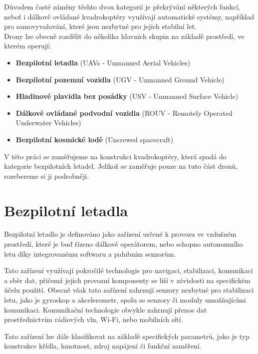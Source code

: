 \documentclass[12pt]{report}
\begin{document}
Důvodem časté záměny těchto dvou kategorií je překrývání některých funkcí, neboť i dálkově ovládané kvadrokoptéry využívají automatické systémy, například pro samovyvažování, které jsou nezbytné pro jejich stabilní let.\\

Drony lze obecně rozdělit do několika hlavních skupin na základě prostředí, ve kterém operují:
\begin{itemize}
	\item \textbf{Bezpilotní letadla} (UAVs - Unmanned Aerial Vehicles)
	\item \textbf{Bezpilotní pozemní vozidla} (UGV - Unmanned Ground Vehicle)
	\item \textbf{Hladinové plavidla bez posádky} (USV - Unmanned Surface Vehicle)
	\item \textbf{Dálkově ovládané podvodní vozidla} (ROUV - Remotely Operated Underwater Vehicles)
	\item \textbf{Bezpilotní kosmické lodě} (Uncrewed spacecraft)
\end{itemize}

V této práci se zaměřujeme na konstrukci kvadrokoptéry, která spadá do kategorie bezpilotních letadel. Jelikož se zaměřuje pouze na tuto část dronů, rozebereme si ji podrobněji. \cite{mainbook}\\

\section{Bezpilotní letadla}

Bezpilotní letadlo je definováno jako zařízení určené k provozu ve vzdušném prostředí, které je buď řízeno dálkově operátorem, nebo schopno autonomního letu díky integrovanému softwaru a palubním senzorům. 

Tato zařízení využívají pokročilé technologie pro navigaci, stabilizaci, komunikaci a sběr dat, přičemž jejich provozní komponenty se liší v závislosti na specifickém účelu použití. Obecně však tato zařízení zahrnují senzory nezbytné pro stabilizaci letu, jako je gyroskop a akcelerometr, spolu se senzory či moduly umožňujícími komunikaci. Komunikační technologie obvykle zahrnují přenos dat prostřednictvím rádiových vln, Wi-Fi, nebo mobilních sítí.

Tato zařízení lze dále klasifikovat na základě specifických parametrů, jako je typ konstrukce křídla, hmotnost, zdroj napájení či funkční zaměření.\\
\end{document}
